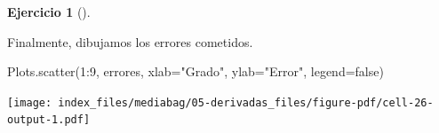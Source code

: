 \documentclass[
  a4paper,
]{scrreport}
\newenvironment{Shaded}{\begin{snugshade}}{\end{snugshade}}
\newcommand{\ConstantTok}[1]{\textcolor[rgb]{0.56,0.35,0.01}{#1}}
\newcommand{\FloatTok}[1]{\textcolor[rgb]{0.68,0.00,0.00}{#1}}
\newcommand{\FunctionTok}[1]{\textcolor[rgb]{0.28,0.35,0.67}{#1}}
\newcommand{\NormalTok}[1]{\textcolor[rgb]{0.00,0.23,0.31}{#1}}
\newcommand{\OperatorTok}[1]{\textcolor[rgb]{0.37,0.37,0.37}{#1}}
\newcommand{\StringTok}[1]{\textcolor[rgb]{0.13,0.47,0.30}{#1}}
\theoremstyle{definition}
\newtheorem{exercise}{Ejercicio}[chapter]
\theoremstyle{remark}
\begin{document}
\begin{exercise}[]
\begin{tcolorbox}
Finalmente, dibujamos los errores cometidos.

\begin{Shaded}
\begin{Highlighting}[]
\NormalTok{Plots.}\FunctionTok{scatter}\NormalTok{(}\FloatTok{1}\OperatorTok{:}\FloatTok{9}\NormalTok{, errores, xlab}\OperatorTok{=}\StringTok{"Grado"}\NormalTok{, ylab}\OperatorTok{=}\StringTok{"Error"}\NormalTok{, legend}\OperatorTok{=}\ConstantTok{false}\NormalTok{)}
\end{Highlighting}
\end{Shaded}

\texttt{[image: index\_files/mediabag/05-derivadas\_files/figure-pdf/cell-26-output-1.pdf]}

\end{tcolorbox}

\end{exercise}
\end{document}
